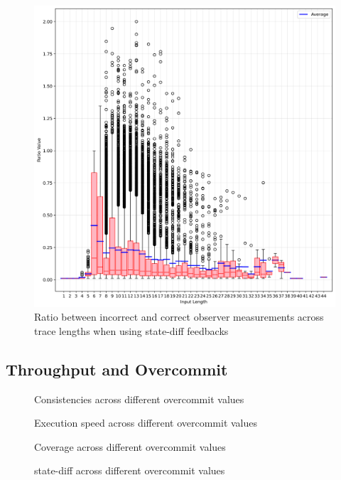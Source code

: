 \documentclass[twocolumn]{article}
\begin{document}
\begin{figure}[htbp]
  \includegraphics[width=\columnwidth]{assets/consistency/state-diff-boxplot.png}
  \caption{Ratio between incorrect and correct observer measurements across trace lengths when using state-diff feedbacks}
  \label{fig:state-diff-inter-boxplot}
\end{figure}

\subsection{Throughput and Overcommit}
\label{Results:Overcommit}

\begin{figure}[htbp]
  \caption{Consistencies across different overcommit values}
  \label{fig:overcommit-consistencies}
\end{figure}
\begin{figure}[htbp]
  \caption{Execution speed across different overcommit values}
  \label{fig:overcommit-exec-speed}
\end{figure}
\begin{figure}[htbp]
  \caption{Coverage across different overcommit values}
  \label{fig:overcommit-cov}
\end{figure}
\begin{figure}[htbp]
  \caption{state-diff across different overcommit values}
  \label{fig:overcommit-state-diff}
\end{figure}
\end{document}
